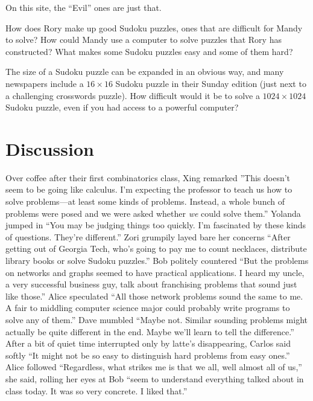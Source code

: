 \begin{example}
\medskip
\noindent
On this site, the ``Evil'' ones are just that.

How does Rory make up good Sudoku puzzles, ones that are difficult
for Mandy to solve?  How could Mandy use
a computer to solve puzzles that Rory has constructed? 
What makes some Sudoku puzzles easy and some of them hard?

The size of a Sudoku puzzle can be expanded in an obvious
way, and many newspapers include a $16\times16$ Sudoku puzzle
in their Sunday edition (just next to a challenging crosswords puzzle).
How difficult would it be to solve a $1024\times1024$ Sudoku puzzle,
even if you had access to a powerful computer?
\end{example}

\section{Discussion}\label{s:intro:closing}

Over coffee after their first combinatorics class, Xing remarked
''This doesn't seem to be going like calculus.  I'm expecting
the professor to teach us how to solve problems---at least some
kinds of problems.  Instead, a whole bunch
of problems were posed and we were asked whether 
\textit{we} could solve them.'' Yolanda jumped in ``You may be 
judging things too quickly.  I'm fascinated by these kinds
of questions.  They're different.''  Zori grumpily layed
bare her concerns
``After getting out of Georgia Tech, who's going to pay me to
count necklaces, distribute library books or solve Sudoku puzzles.''
Bob politely countered ``But the problems on networks and graphs
seemed to have practical applications.  I heard my uncle, a very
successful business guy, talk about franchising problems that
sound just like those.''  Alice speculated ``All those network problems
sound the same to me.  A fair to middling computer science major could 
probably write programs to solve any of them.''  Dave mumbled ``Maybe not.
Similar sounding problems might actually be quite different in the end.  
Maybe we'll learn to tell the difference.'' 
After a bit of quiet time interrupted only by latte's disappearing,
Carlos said softly ``It might not be so easy to distinguish hard 
problems from easy ones.'' Alice followed ``Regardless, what strikes 
me is that we all,  well almost all of us,''
she said, rolling her eyes at Bob ``seem to understand everything talked 
about in class today.  It was so very concrete. I liked that.''

